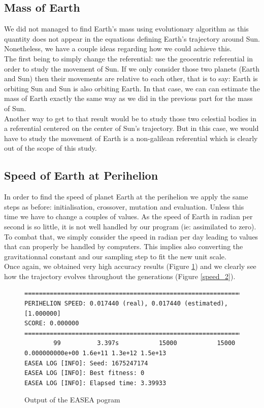 \subsection{Mass of Earth}
We did not managed to find Earth's mass using evolutionary algorithm as this quantity does not appear in the equations defining Earth's trajectory around Sun. Nonetheless, we have a couple ideas regarding how we could achieve this.\\
The first being to simply change the referential: use the geocentric referential in order to study the movement of Sun. If we only consider those two planets (Earth and Sun) then their movements are relative to each other, that is to say: Earth is orbiting Sun and Sun is also orbiting Earth. In that case, we can can estimate the mass of Earth exactly the same way as we did in the previous part for the mass of Sun.\\
Another way to get to that result would be to study those two celestial bodies in a referential centered on the center of Sun's trajectory. But in this case, we would have to study the movement of Earth is a non-galilean referential which is clearly out of the scope of this study.

\subsection{Speed of Earth at Perihelion}
In order to find the speed of planet Earth at the perihelion we apply the same steps as before: initialisation, crossover, mutation and evaluation. Unless this time we have to change a couples of values. As the speed of Earth in radian per second is so little, it is not well handled by our program (ie: assimilated to zero). To combat that, we simply consider the speed in radian per day leading to values that can properly be handled by computers. This implies also converting the gravitationnal constant and our sampling step to fit the new unit scale.\\
Once again, we obtained very high accuracy results (Figure \ref{speed_1}) and we clearly see how the trajectory evolves throughout the generations (Figure \ref{speed_2}).

\begin{figure}[H]
\begin{lstlisting}
==================================================================
PERIHELION SPEED: 0.017440 (real), 0.017440 (estimated), [1.000000]
SCORE: 0.000000
==================================================================
        99          3.397s           15000           15000 0.000000000e+00 1.6e+11 1.3e+12 1.5e+13
EASEA LOG [INFO]: Seed: 1675247174
EASEA LOG [INFO]: Best fitness: 0
EASEA LOG [INFO]: Elapsed time: 3.39933
\end{lstlisting}
\caption{Output of the EASEA pogram}
\label{speed_1}
\end{figure}

